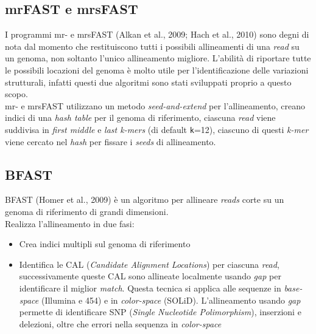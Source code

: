 \documentclass[conference]{IEEEtran}
\begin{document}
	\subsection{mrFAST e mrsFAST}
	I programmi mr- e mrsFAST (Alkan et al., 2009; Hach et al., 2010) sono degni di nota dal momento che restituiscono tutti i possibili allineamenti di una \textit{read} su un genoma, non soltanto l'unico allineamento migliore. L'abilità di riportare tutte le possibili locazioni del genoma è molto utile per l'identificazione delle variazioni strutturali, infatti questi due algoritmi sono stati sviluppati proprio a questo scopo.\\

mr- e mrsFAST utilizzano un metodo \textit{seed-and-extend} per l'allineamento, creano indici di una \textit{hash table} per il genoma di riferimento, ciascuna \textit{read} viene suddivisa in \textit{first middle} e \textit{last k-mers} (di default \texttt{k}=12), ciascuno di questi \textit{k-mer} viene cercato nel \textit{hash} per fissare i \textit{seeds} di allineamento.

	\subsection{BFAST}
	BFAST (Homer et al., 2009) è un algoritmo per allineare \textit{reads} corte su un genoma di riferimento di grandi dimensioni.\\
	Realizza l'allineamento in due fasi:
	\begin{itemize}
		\item Crea indici multipli sul genoma di riferimento
		\item Identifica le CAL (\textit{Candidate Alignment Locations}) per ciascuna \textit{read}, successivamente queste CAL sono allineate localmente usando \textit{gap} per identificare il miglior \textit{match}. Questa tecnica si applica alle sequenze in \textit{base-space} (Illumina e 454) e in \textit{color-space} (SOLiD). L'allineamento usando \textit{gap} permette di identificare SNP (\textit{Single Nucleotide Polimorphism}), inserzioni e delezioni, oltre che errori nella sequenza in \textit{color-space}\\
	\end{itemize}
\end{document}
